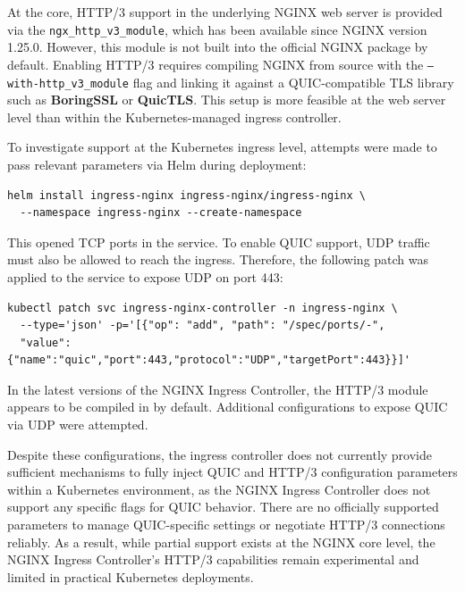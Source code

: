 At the core, HTTP/3 support in the underlying NGINX web server is provided via the \texttt{ngx\_http\_v3\_module}, which has been available since NGINX version 1.25.0. However, this module is not built into the official NGINX package by default. Enabling HTTP/3 requires compiling NGINX from source with the \texttt{--with-http\_v3\_module} flag and linking it against a QUIC-compatible TLS library such as \textbf{BoringSSL} or \textbf{QuicTLS}. This setup is more feasible at the web server level than within the Kubernetes-managed ingress controller.

To investigate support at the Kubernetes ingress level, attempts were made to pass relevant parameters via Helm during deployment:

\begin{lstlisting}[breaklines=true,basicstyle=\small\ttfamily,frame=single]
helm install ingress-nginx ingress-nginx/ingress-nginx \
  --namespace ingress-nginx --create-namespace
\end{lstlisting}

This opened TCP ports in the service. To enable QUIC support, UDP traffic must also be allowed to reach the ingress. Therefore, the following patch was applied to the service to expose UDP on port 443:

\begin{lstlisting}[breaklines=true,basicstyle=\small\ttfamily,frame=single]
kubectl patch svc ingress-nginx-controller -n ingress-nginx \
  --type='json' -p='[{"op": "add", "path": "/spec/ports/-", 
  "value": {"name":"quic","port":443,"protocol":"UDP","targetPort":443}}]'
\end{lstlisting}

In the latest versions of the NGINX Ingress Controller, the HTTP/3 module appears to be compiled in by default. Additional configurations to expose QUIC via UDP were attempted.

Despite these configurations, the ingress controller does not currently provide sufficient mechanisms to fully inject QUIC and HTTP/3 configuration parameters within a Kubernetes environment, as the NGINX Ingress Controller does not support any specific flags for QUIC behavior. There are no officially supported parameters to manage QUIC-specific settings or negotiate HTTP/3 connections reliably. As a result, while partial support exists at the NGINX core level, the NGINX Ingress Controller's HTTP/3 capabilities remain experimental and limited in practical Kubernetes deployments.



